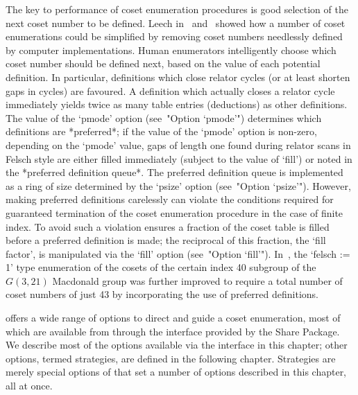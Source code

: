 The key  to  performance  of  coset  enumeration  procedures  is  good
selection  of  the  next   coset   number   to   be   defined.   Leech
in~\cite{Lee77}  and~\cite{Lee84}  showed  how  a  number   of   coset
enumerations could be simplified by removing coset numbers  needlessly
defined by computer implementations. Human  enumerators  intelligently
choose which coset number should be defined next, based on  the  value
of each potential definition. In particular, definitions  which  close
relator cycles (or at least shorten gaps in cycles)  are  favoured.  A
definition which actually closes a relator  cycle  immediately  yields
twice as many table entries (deductions)  as  other  definitions.  The
value of the `pmode' option (see~"Option  `pmode'")  determines  which
definitions are *preferred*; if the value of  the  `pmode'  option  is
non-zero, depending on the `pmode' value, gaps  of  length  one  found
during relator scans in Felsch style  are  either  filled  immediately
(subject to the value of `fill') or noted in the *preferred definition
queue*. The preferred definition queue is implemented  as  a  ring  of
size determined by the `psize' option (see~"Option `psize'"). However,
making preferred definitions carelessly  can  violate  the  conditions
required for guaranteed termination of the coset enumeration procedure
in the case of finite index. To avoid such a violation {\ACE}  ensures
a fraction of the coset table is filled before a preferred  definition
is made; the reciprocal  of  this  fraction,  the  `fill  factor',  is
manipulated   via   the   `fill'   option    (see~"Option    `fill'").
In~\cite{Hav91}, the `felsch := 1' type enumeration of the  cosets  of
the certain index 40 subgroup of the  $G(3,21)$  Macdonald  group  was
further improved to require a total number of coset numbers of just 43
by incorporating the use of preferred definitions.



{\ACE} offers a wide range of options to  direct  and  guide  a  coset
enumeration, most of which  are  available  from  {\GAP}  through  the
interface provided by the {\ACE} Share Package. We  describe  most  of
the options  available  via  the  interface  in  this  chapter;  other
options, termed strategies, are  defined  in  the  following  chapter.
Strategies are merely special options of {\ACE} that set a  number  of
options described in this chapter, all at once.

